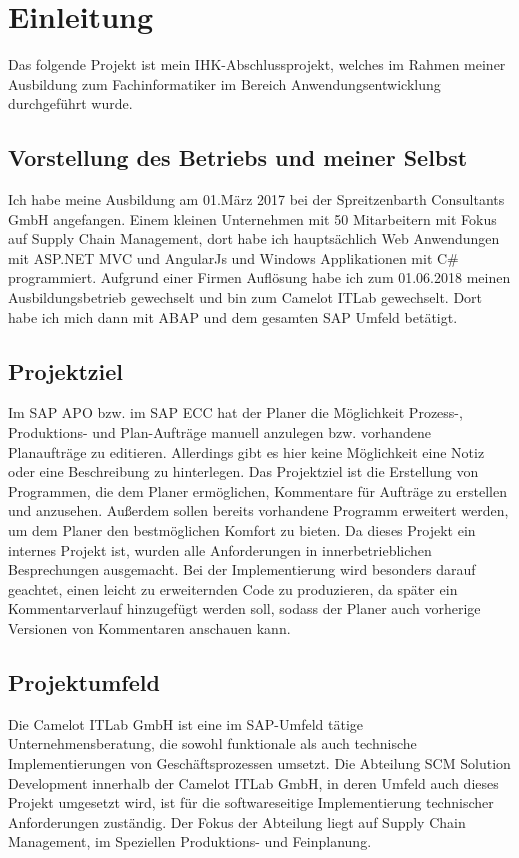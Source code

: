 \section{Einleitung}
\label{sec:Einleitung}
Das folgende Projekt ist mein IHK-Abschlussprojekt, welches im Rahmen meiner Ausbildung zum Fachinformatiker im Bereich Anwendungsentwicklung durchgeführt wurde.

\subsection{Vorstellung des Betriebs und meiner Selbst} 
\label{sec:Vorstellung des Betriebs und meiner Selbst}
Ich habe meine Ausbildung am 01.März 2017 bei der Spreitzenbarth Consultants GmbH angefangen. Einem kleinen Unternehmen mit 50 Mitarbeitern mit Fokus auf Supply Chain Management, dort habe ich hauptsächlich Web Anwendungen mit ASP.NET MVC und AngularJs  und Windows Applikationen mit C\# programmiert. Aufgrund einer Firmen Auflösung habe ich zum 01.06.2018 meinen Ausbildungsbetrieb gewechselt und bin zum Camelot ITLab gewechselt. Dort habe ich mich dann mit \ac{ABAP} und dem gesamten SAP Umfeld betätigt.

\subsection{Projektziel} 
\label{sec:Projektziel}
Im SAP \ac{APO} bzw. im SAP \ac{ECC} hat der Planer die Möglichkeit Prozess-, Produktions- und Plan-Aufträge manuell anzulegen bzw. vorhandene Planaufträge zu editieren. Allerdings gibt es hier keine Möglichkeit eine Notiz oder eine Beschreibung zu hinterlegen. Das Projektziel ist die Erstellung von Programmen, die dem Planer ermöglichen, Kommentare	für Aufträge zu erstellen und anzusehen. Außerdem sollen bereits vorhandene Programm erweitert werden, um dem Planer den bestmöglichen Komfort zu bieten. Da dieses Projekt ein internes Projekt ist, wurden alle Anforderungen in innerbetrieblichen Besprechungen ausgemacht.  Bei der Implementierung wird besonders darauf geachtet, einen leicht zu erweiternden Code zu produzieren, da später ein Kommentarverlauf hinzugefügt werden soll, sodass der Planer auch vorherige Versionen von Kommentaren anschauen kann. 

\subsection{Projektumfeld}
\label{sec:Projektumfeld}
Die Camelot ITLab GmbH ist eine im SAP-Umfeld tätige Unternehmensberatung, die sowohl funktionale als auch technische Implementierungen von Geschäftsprozessen umsetzt.	Die Abteilung SCM Solution Development innerhalb der Camelot ITLab GmbH, in deren Umfeld	auch dieses Projekt umgesetzt wird, ist für die softwareseitige Implementierung technischer	Anforderungen zuständig. Der Fokus der Abteilung liegt auf Supply Chain Management, im Speziellen Produktions- und Feinplanung.

